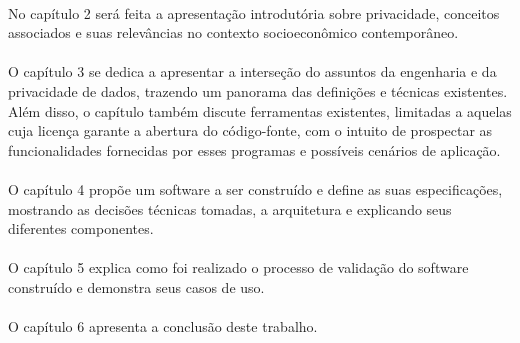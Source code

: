 \paragraph{}No capítulo 2 será feita a apresentação introdutória sobre privacidade, conceitos associados e suas relevâncias no contexto socioeconômico contemporâneo.

\paragraph{}O capítulo 3 se dedica a apresentar a interseção do assuntos da engenharia e da privacidade de dados, trazendo um panorama das definições e técnicas existentes. Além disso, o capítulo também discute ferramentas existentes, limitadas a aquelas cuja licença garante a abertura do código-fonte, com o intuito de prospectar as funcionalidades fornecidas por esses programas e possíveis cenários de aplicação.

\paragraph{}O capítulo 4 propõe um software a ser construído e define as suas especificações, mostrando as decisões técnicas tomadas, a arquitetura e explicando seus diferentes componentes.

\paragraph{}O capítulo 5 explica como foi realizado o processo de validação do software construído e demonstra seus casos de uso.

\paragraph{}O capítulo 6 apresenta a conclusão deste trabalho.
